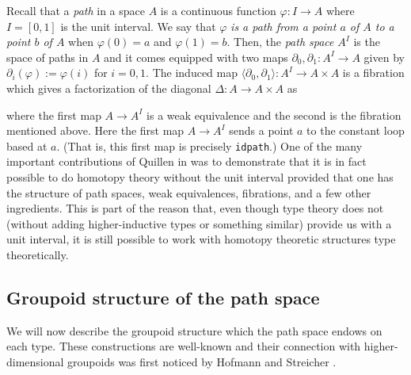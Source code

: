 Recall that a \emph{path} in a space $A$ is a continuous function
$\varphi:I\to A$ where $I=[0,1]$ is the unit interval.  We say that
$\varphi$ \emph{is a path from a point $a$ of $A$ to a point $b$ of $A$} when
$\varphi(0)=a$ and $\varphi(1)=b$.  Then, the \emph{path space} $A^{I}$ is
the space of paths in $A$ and it comes equipped with two maps
$\partial_{0},\partial_{1}:A^{I}\to A$ given by
$\partial_{i}(\varphi):=\varphi(i)$ for $i=0,1$.  The induced map
$\langle\partial_{0},\partial_{1}\rangle: A^{I}\to A\times A$ is a
fibration which gives a factorization of the diagonal $\Delta:A\to
A\times A$ as 
\begin{center}
\end{center}
where the first map $A\to A^{I}$ is a weak equivalence and the second is the
fibration mentioned above.  Here the first map $A\to A^{I}$ sends a
point $a$ to the constant loop based at $a$.  (That is, this first map
is precisely \verb|idpath|.)  One of the many important contributions of Quillen in
\cite{Quillen:1967uz} was to demonstrate that it is in fact possible
to do homotopy theory without the unit interval provided that one has
the structure of path spaces, weak equivalences, fibrations, and a few
other ingredients.  This is part of the reason that, even though type
theory does not (without adding higher-inductive types or something
similar) provide us with a unit interval, it is still possible to work
with homotopy theoretic structures type theoretically.

\subsection{Groupoid structure of the path space}

We will now describe the groupoid structure which the path space
endows on each type.  These constructions are well-known and their
connection with higher-dimensional groupoids was first noticed by
Hofmann and Streicher \cite{Hofmann:1998ty}.


